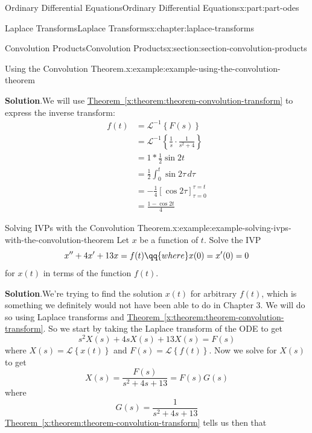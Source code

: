 \documentclass[twoside,10pt,]{book}
\newcommand{\blocktitlefont}{\relax}
\newcommand{\xreffont}{\relax}
\numberwithin{equation}{part}
\newcommand{\Int}[2]{\int_{#1}^{#2}}
\newcommand{\Laplace}[1]{\mathcal{L}\left\{#1\right\}}
\newcommand{\iLaplace}[1]{\mathcal{L}^{-1}\left\{#1\right\}}
\newcommand{\amp}{&}
\begin{document}
\begin{partptx}{Ordinary Differential Equations}{}{Ordinary Differential Equations}{}{}{x:part:part-odes}
\begin{chapterptx}{Laplace Transforms}{}{Laplace Transforms}{}{}{x:chapter:laplace-transforms}
\begin{sectionptx}{Convolution Products}{}{Convolution Products}{}{}{x:section:section-convolution-products}
\begin{example}{Using the Convolution Theorem.}{x:example:example-using-the-convolution-theorem}
\par\smallskip%
\noindent\textbf{\blocktitlefont Solution}.\hypertarget{g:solution:idp105548816763168}{}\quad{}We will use \hyperref[x:theorem:theorem-convolution-transform]{Theorem~{\xreffont\ref{x:theorem:theorem-convolution-transform}}} to express the inverse transform:%
\begin{align*}
f(t) \amp= \iLaplace{F(s)}\\
\amp= \iLaplace{\frac{1}{s}\cdot\frac{1}{s^{2}+4}}\\
\amp= 1\ast \frac{1}{2}\sin2t\\
\amp= \frac{1}{2}\Int{0}{t}\sin2\tau\,d\tau\\
\amp= -\frac{1}{4}\left[\cos2\tau\right]_{\tau=0}^{\tau=t}\\
\amp= \frac{1-\cos2t}{4}
\end{align*}
%
\end{example}
\begin{example}{Solving IVPs with the Convolution Theorem.}{x:example:example-solving-ivps-with-the-convolution-theorem}%
Let \(x\) be a function of \(t\). Solve the IVP%
\begin{equation*}
x''+4x'+13x = f(t)\qq{where}x(0) = x'(0) = 0
\end{equation*}
for \(x(t)\) in terms of the function \(f(t)\).%
\par\smallskip%
\noindent\textbf{\blocktitlefont Solution}.\hypertarget{g:solution:idp105548816735904}{}\quad{}We're trying to find the solution \(x(t)\) for arbitrary \(f(t)\), which is something we definitely would not have been able to do in Chapter 3. We will do so using Laplace transforms and \hyperref[x:theorem:theorem-convolution-transform]{Theorem~{\xreffont\ref{x:theorem:theorem-convolution-transform}}}. So we start by taking the Laplace transform of the ODE to get%
\begin{equation*}
s^{2}X(s) +4sX(s) + 13X(s) = F(s)
\end{equation*}
where \(X(s) = \Laplace{x(t)}\) and \(F(s) = \Laplace{f(t)}\). Now we solve for \(X(s)\) to get%
\begin{equation*}
X(s) = \frac{F(s)}{s^{2}+4s+13} = F(s)G(s)
\end{equation*}
where%
\begin{equation*}
G(s) = \frac{1}{s^{2}+4s+13}
\end{equation*}
\hyperref[x:theorem:theorem-convolution-transform]{Theorem~{\xreffont\ref{x:theorem:theorem-convolution-transform}}} tells us then that%
\begin{equation*}

\end{equation*}
\end{example}
\end{sectionptx}
\end{chapterptx}
\end{partptx}
\end{document}
